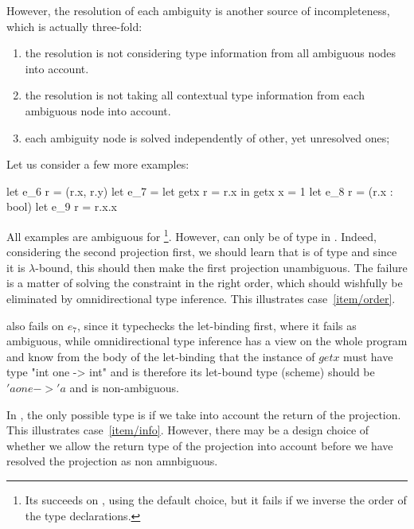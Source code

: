 \documentclass[acmsmall,screen,nonacm]{acmart}
\begin{document}
However, the resolution of each ambiguity is another source of
incompleteness, which is actually three-fold:
\begin{enumerate}
\item\label {item/order}
  the resolution is not considering type information from all ambiguous
  nodes into account.
\item\label {item/info}
  the resolution is not taking all contextual type information from
  each ambiguous node into account.
\item\label {item/simultaneous}
  each ambiguity node is solved independently of other, yet unresolved ones;
\end{enumerate}
Let us consider a few more examples:
\begin{program}[error]
let e_6 r = (r.x, r.y)
let e_7 = let getx r = r.x in getx {x = 1}
let e_8 r = (r.x : bool)
let e_9 r = r.x.x
\end{program}
All examples are ambiguous for \OCaml\footnote{Its succeeds on ,
using the default choice, but it fails if we inverse the order of the type
declarations.}.  However,  can only be of type
 in . Indeed, considering the second projection first,
we should learn that  is of type  and since it is
$\lambda$-bound, this should then make the first projection unambiguous.
The failure is a matter of solving the constraint in the right order, which
should wishfully be eliminated by omnidirectional type inference.
This illustrates case~\ref {item/order}.

\OCaml also fails on \ocaml$e_7$, since it typechecks the let-binding first,
where it fails as ambiguous, while omnidirectional type inference
has a view on the whole program and know from the body of the let-binding
that the instance of $getx$ must have type \ocaml"int one -> int" and is
therefore its let-bound type (scheme) should be \ocaml$'a one -> 'a$ and is
non-ambiguous.

In , the only possible type is  if we take into account
the return of the projection. This illustrates case~\ref {item/info}.
However, there may be a design choice of whether we allow the return type of
the projection into account before we have resolved the projection as non
amnbiguous.
\end{document}
